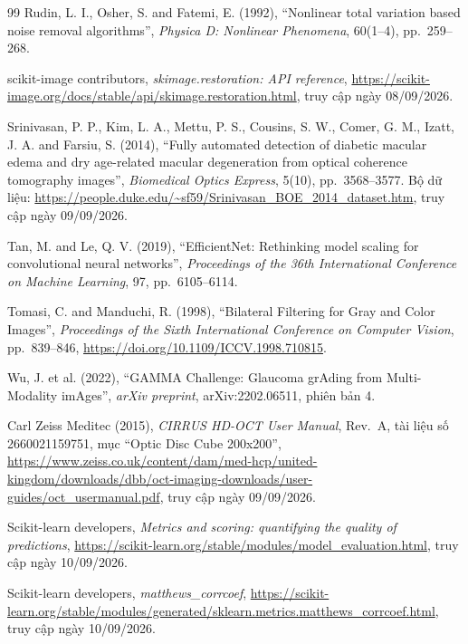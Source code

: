 \documentclass[14pt,a4paper,oneside]{extreport}
\begin{document}
\begin{thebibliography}{99}
Rudin, L. I., Osher, S. and Fatemi, E. (1992), ``Nonlinear total variation
based noise removal algorithms'', \textit{Physica D: Nonlinear Phenomena},
60(1--4), pp.~259--268.

scikit-image contributors, \textit{skimage.restoration: API reference},
\url{https://scikit-image.org/docs/stable/api/skimage.restoration.html},
truy cập ngày 08/09/2026.

Srinivasan, P. P., Kim, L. A., Mettu, P. S., Cousins, S. W.,
Comer, G. M., Izatt, J. A. and Farsiu, S. (2014),
``Fully automated detection of diabetic macular edema and dry age-related
macular degeneration from optical coherence tomography images'',
\textit{Biomedical Optics Express}, 5(10), pp.~3568--3577.
Bộ dữ liệu: \url{https://people.duke.edu/~sf59/Srinivasan_BOE_2014_dataset.htm},
truy cập ngày 09/09/2026.

Tan, M. and Le, Q. V. (2019), ``EfficientNet: Rethinking model scaling for
convolutional neural networks'', \textit{Proceedings of the 36th International
Conference on Machine Learning}, 97, pp.~6105--6114.

Tomasi, C. and Manduchi, R. (1998), ``Bilateral Filtering for Gray and Color
Images'', \textit{Proceedings of the Sixth International Conference on
Computer Vision}, pp.~839--846,
\url{https://doi.org/10.1109/ICCV.1998.710815}.

Wu, J. et al. (2022), ``GAMMA Challenge: Glaucoma grAding from
Multi-Modality imAges'', \textit{arXiv preprint}, arXiv:2202.06511,
phiên bản 4.

Carl Zeiss Meditec (2015), \textit{CIRRUS HD-OCT User Manual},
Rev.~A, tài liệu số 2660021159751, mục ``Optic Disc Cube 200x200'',
\url{https://www.zeiss.co.uk/content/dam/med-hcp/united-kingdom/downloads/dbb/oct-imaging-downloads/user-guides/oct_usermanual.pdf},
truy cập ngày 09/09/2026.

Scikit-learn developers, \textit{Metrics and scoring: quantifying the quality
of predictions}, \url{https://scikit-learn.org/stable/modules/model_evaluation.html},
truy cập ngày 10/09/2026.

Scikit-learn developers, \textit{matthews\_corrcoef},
\url{https://scikit-learn.org/stable/modules/generated/sklearn.metrics.matthews_corrcoef.html},
truy cập ngày 10/09/2026.


\end{thebibliography}
\end{document}
